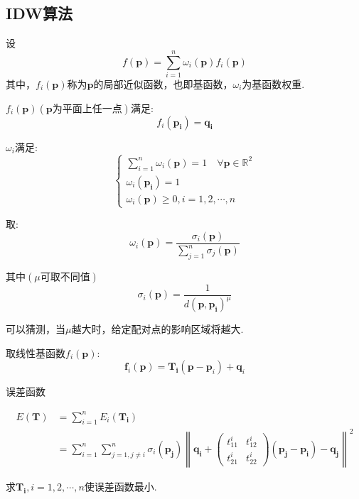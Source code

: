 \documentclass[12pt]{article}
\begin{document}
		\subsection{IDW算法}
		设
		$$f(\mathbf{p})=\sum_{i=1}^{n} \omega_{i}(\mathbf{p}) f_{i}(\mathbf{p})$$
		其中，$f_{i}\left(\mathbf{p}\right)$称为$\mathbf{p}$的局部近似函数，也即基函数，$\omega_{i}$为基函数权重.
		
		$f_{i}\left(\mathbf{p}\right)(\mathbf{p}\text{为平面上任一点})$满足:
		$$f_{i}\left(\mathbf{p}_{\mathbf{i}}\right)=\mathbf{q}_{\mathbf{i}}$$
		
		$\omega_{i}$满足:$$
		\left\{\begin{array}{l}
			\sum_{i=1}^{n} \omega_{i}(\mathbf{p})=1 \quad \forall \mathbf{p} \in \mathbb{R}^{2}\\
			\omega_{i}\left(\mathbf{p}_{\mathbf{i}}\right)=1  \\
			\omega_{i}(\mathbf{p}) \geqslant 0, i=1,2, \cdots, n
		\end{array}\right.
		$$
		
		取:$$
		\omega_{i}(\mathbf{p})=\frac{\sigma_{i}(\mathbf{p})}{\sum_{j=1}^{n} \sigma_{j}(\mathbf{p})}
		$$
		
		其中$\left(\mu\text{可取不同值}\right)$
		$$
		\sigma_{i}(\mathbf{p})=\frac{1}{d\left(\mathbf{p}, \mathbf{p}_{\mathbf{i}}\right)^{\mu}}
		$$
		
		可以猜测，当$\mu$越大时，给定配对点的影响区域将越大.
		
		取线性基函数$f_{i}\left(\mathbf{p}\right)$:$$
		\mathbf{f}_{i}(\mathbf{p})=\mathbf{T}_{\mathbf{i}}\left(\mathbf{p}-\mathbf{p}_{i}\right)+\mathbf{q}_{i}
		$$
		
		误差函数
		
		\[
		\begin{split}
		E\left(\mathbf{T}\right)
		&=\sum_{i=1}^{n}E_{i}\left(\mathbf{T}_{\mathbf{i}}\right)\\
		&=\sum_{i=1}^{n}\sum_{j=1, j \neq i}^{n} \sigma_{i}\left(\mathbf{p}_{\mathbf{j}}\right)\left\|\mathbf{q}_{\mathbf{i}}+\left(\begin{array}{cc}
			t_{11}^{i} & t_{12}^{i} \\
			t_{21}^{i} & t_{22}^{i}
		\end{array}\right)\left(\mathbf{p}_{\mathbf{j}}-\mathbf{p}_{\mathbf{i}}\right)-\mathbf{q}_{\mathbf{j}}\right\|^{2}
		\end{split}
		\]
		
		求$\mathbf{T}_{\mathbf{i}},i=1,2, \cdots, n$使误差函数最小.
		
\end{document}
